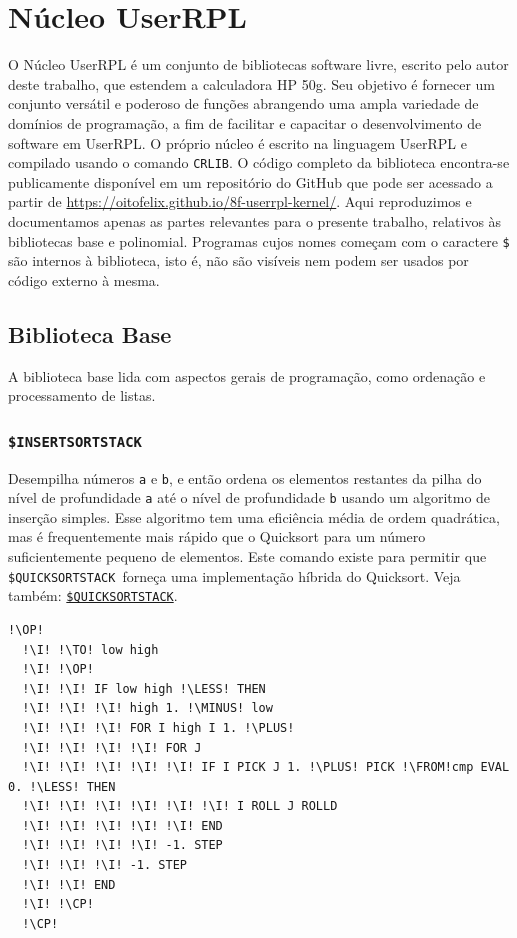 \documentclass[12pt,a4paper]{report}
\newcommand{\kwd}[1]{\texttt{\textcolor{keyword}{#1}}}
\newcommand{\I}{\enspace\textcolor{indent}\vrule\hspace{2pt}}
\newcommand{\LESS}{\kwd{$<$}}   %
\newcommand{\PLUS}{\kwd{+}}   %
\newcommand{\MINUS}{\kwd{-}}   %
\newcommand{\SINSERTSORTSTACK}{\kwd{\$INSERTSORTSTACK}}   %
\newcommand{\SQUICKSORTSTACK}{\kwd{\$QUICKSORTSTACK}}   %
\newcommand{\OP}{\kwd{$\ll$}}   %
\newcommand{\CP}{\kwd{$\gg$}}   %
\newcommand{\TO}{\kwd{$\rightarrow$}} %
\newcommand{\FROM}{\kwd{$\leftarrow$}} %
\numberwithin{theorem}{chapter}
\begin{document}

\section{Núcleo UserRPL}

O Núcleo UserRPL é um conjunto de bibliotecas software livre, escrito
pelo autor deste trabalho, que estendem a calculadora HP 50g.  Seu
objetivo é fornecer um conjunto versátil e poderoso de funções
abrangendo uma ampla variedade de domínios de programação, a fim de
facilitar e capacitar o desenvolvimento de software em UserRPL.  O
próprio núcleo é escrito na linguagem UserRPL e compilado usando o
comando \kwd{CRLIB}.  O código completo da biblioteca encontra-se
publicamente disponível em um repositório do GitHub que pode ser
acessado a partir de
\url{https://oitofelix.github.io/8f-userrpl-kernel/}.  Aqui
reproduzimos e documentamos apenas as partes relevantes para o
presente trabalho, relativos às bibliotecas base e polinomial.
Programas cujos nomes começam com o caractere \texttt{\$} são internos
à biblioteca, isto é, não são visíveis nem podem ser usados por código
externo à mesma.

\subsection{Biblioteca Base}

A biblioteca base lida com aspectos gerais de programação, como
ordenação e processamento de listas.

\subsubsection{\SINSERTSORTSTACK}\label{SINSERTSORTSTACK}
Desempilha números \texttt{a} e \texttt{b}, e então ordena os
elementos restantes da pilha do nível de profundidade \texttt{a} até o
nível de profundidade \texttt{b} usando um algoritmo de inserção
simples.  Esse algoritmo tem uma eficiência média de ordem quadrática,
mas é frequentemente mais rápido que o Quicksort para um número
suficientemente pequeno de elementos.  Este comando existe para
permitir que \SQUICKSORTSTACK\ forneça uma implementação híbrida do
Quicksort.  Veja também: \hyperref[SQUICKSORTSTACK]{\SQUICKSORTSTACK}.
\begin{lstlisting}[language=userrpl]
  !\OP!
  !\I! !\TO! low high
  !\I! !\OP!
  !\I! !\I! IF low high !\LESS! THEN
  !\I! !\I! !\I! high 1. !\MINUS! low
  !\I! !\I! !\I! FOR I high I 1. !\PLUS!
  !\I! !\I! !\I! !\I! FOR J
  !\I! !\I! !\I! !\I! !\I! IF I PICK J 1. !\PLUS! PICK !\FROM!cmp EVAL 0. !\LESS! THEN
  !\I! !\I! !\I! !\I! !\I! !\I! I ROLL J ROLLD
  !\I! !\I! !\I! !\I! !\I! END
  !\I! !\I! !\I! !\I! -1. STEP
  !\I! !\I! !\I! -1. STEP
  !\I! !\I! END
  !\I! !\CP!
  !\CP!
\end{lstlisting}
\end{document}
